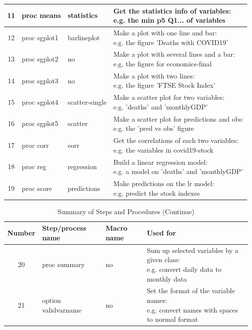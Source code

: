 \documentclass[12pt, a4paper]{report}
\begin{document}
\begin{appendices}
\begin{table}[H]
\begin{tabular}{|c|l|l|l|}
        \hline        
        11&proc means&statistics&\makecell[l]{Get the statistics info of variables:\\e.g. the min p5 Q1... of variables}\\
        \hline
        12&proc sgplot1&barlineplot&\makecell[l]{Make a plot with one line and bar:\\e.g. the figure 'Deaths with COVID19'}\\
        \hline
        13&proc sgplot2&no&\makecell[l]{Make a plot with several lines and a bar:\\e.g. the figure for economics-final}\\
        \hline
        14&proc sgplot3&no&\makecell[l]{Make a plot with two lines:\\e.g. the figure 'FTSE Stock Index'}\\
        \hline
        15&proc sgplot4&scatter-single&\makecell[l]{Make a scatter plot for two variables:\\e.g. 'deaths' and 'monthlyGDP'}\\
        \hline
        16&proc sgplot5&scatter&\makecell[l]{Make a scatter plot for predictions and obs:\\e.g. the 'pred vs obs' figure}\\
        \hline
        17&proc corr&corr&\makecell[l]{Get the correlations of each two variables:\\e.g. the variables in covid19-stock}\\
        \hline
        18&proc reg&regression&\makecell[l]{Build a linear regression model:\\e.g. a model on 'deaths' and 'monthlyGDP'}\\
        \hline
        19&proc score&predictions&\makecell[l]{Make predictions on the lr model:\\e.g. predict the stock indexes}\\
        \hline              

    \end{tabular}
\end{table}   

\setcounter{table}{0}
\begin{table}[H]
    \caption{Summary of Steps and Procedures (Continue)}
    \begin{tabular}{|c|l|l|l|}
        \hline
        Number&Step/process name&Macro name&Used for\\
        \hline
        20&proc summary&no&\makecell[l]{Sum up selected variables by a given class:\\e.g. convert daily data to monthly data}\\
        \hline
        21&option validvarname&no&\makecell[l]{Set the format of the variable names:\\e.g. convert names with spaces
        to normal format}\\
        \hline

    \end{tabular}
\end{table} 

\end{appendices}
\end{document}
